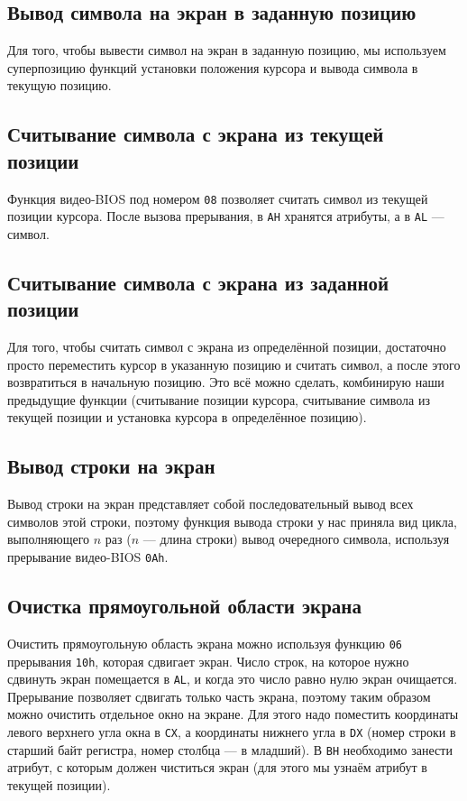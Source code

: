 \documentclass[a4paper,12pt,notitlepage,pdftex,headsepline]{scrartcl}
\begin{document}
\subsection{Вывод символа на экран в заданную позицию}
Для того, чтобы вывести символ на экран в заданную позицию, мы используем суперпозицию функций установки положения курсора и вывода символа в текущую позицию.
\subsection{Считывание символа с экрана из текущей позиции}
Функция видео-BIOS под номером \texttt{08} позволяет считать символ из текущей позиции курсора.
После вызова прерывания, в \texttt{AH} хранятся атрибуты, а в \texttt{AL} --- символ.
\subsection{Считывание символа с экрана из заданной позиции}
Для того, чтобы считать символ с экрана из определённой позиции, достаточно просто переместить курсор в указанную позицию и считать символ, а после этого возвратиться в начальную позицию.
Это всё можно сделать, комбинирую наши предыдущие функции (считывание позиции курсора, считывание символа из текущей позиции и установка курсора в определённое позицию).
\subsection{Вывод строки на экран}
Вывод строки на экран представляет собой последовательный вывод всех символов этой строки, поэтому функция вывода строки у нас приняла вид цикла, выполняющего $n$ раз ($n$ --- длина строки) вывод очередного символа, используя прерывание видео-BIOS \texttt{0Ah}.
\subsection{Очистка прямоугольной области экрана}
Очистить прямоугольную область экрана можно используя функцию \texttt{06} прерывания \texttt{10h}, которая сдвигает экран.
Число строк, на которое нужно сдвинуть экран помещается в \texttt{AL}, и когда это число равно нулю экран очищается.
Прерывание позволяет сдвигать только часть экрана, поэтому таким образом можно очистить отдельное окно на экране.
Для этого надо поместить координаты левого верхнего угла окна в \texttt{CX}, а координаты нижнего угла в \texttt{DX} (номер строки в старший байт регистра, номер столбца --- в младший).
В \texttt{BH} необходимо занести атрибут, с которым должен чиститься экран (для этого мы узнаём атрибут в текущей позиции).
\end{document}
